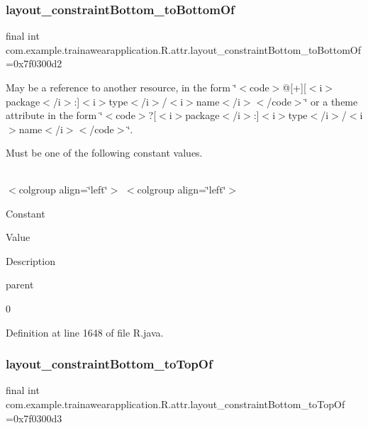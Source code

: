 \subsubsection{\texorpdfstring{layout\_constraintBottom\_toBottomOf}{layout\_constraintBottom\_toBottomOf}}
{\footnotesize\ttfamily final int com.\+example.\+trainawearapplication.\+R.\+attr.\+layout\+\_\+constraint\+Bottom\+\_\+to\+Bottom\+Of =0x7f0300d2\hspace{0.3cm}{\ttfamily [static]}}

May be a reference to another resource, in the form \char`\"{}$<$code$>$@\mbox{[}+\mbox{]}\mbox{[}$<$i$>$package$<$/i$>$\+:\mbox{]}$<$i$>$type$<$/i$>$/$<$i$>$name$<$/i$>$$<$/code$>$\char`\"{} or a theme attribute in the form \char`\"{}$<$code$>$?\mbox{[}$<$i$>$package$<$/i$>$\+:\mbox{]}$<$i$>$type$<$/i$>$/$<$i$>$name$<$/i$>$$<$/code$>$\char`\"{}. 

Must be one of the following constant values.

\tabulinesep=1mm
\begin{longtabu}spread 0pt [c]{*{0}{|X[-1]}|}
\hline
\end{longtabu}
$<$colgroup align=\char`\"{}left\char`\"{}$>$ $<$colgroup align=\char`\"{}left\char`\"{}$>$ 

Constant

Value

Description 

parent

0

Definition at line 1648 of file R.\+java.

\mbox{\label{classcom_1_1example_1_1trainawearapplication_1_1_r_1_1attr_a72f8694d56ba40f8e2b1dddc99f3b677}} 
\subsubsection{\texorpdfstring{layout\_constraintBottom\_toTopOf}{layout\_constraintBottom\_toTopOf}}
{\footnotesize\ttfamily final int com.\+example.\+trainawearapplication.\+R.\+attr.\+layout\+\_\+constraint\+Bottom\+\_\+to\+Top\+Of =0x7f0300d3\hspace{0.3cm}{\ttfamily [static]}}

